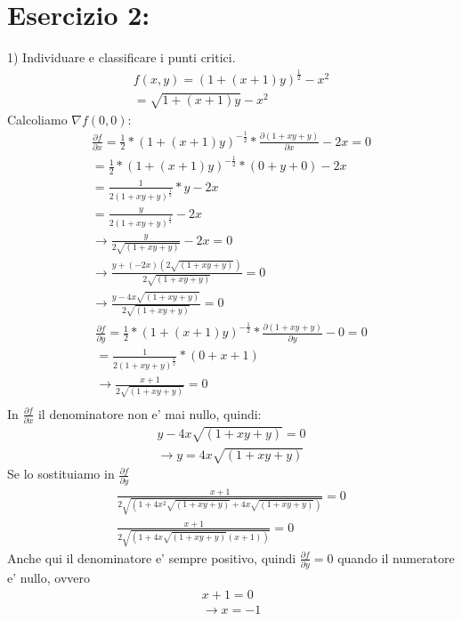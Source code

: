 \documentclass{article}
\begin{document}
\section*{Esercizio 2:}
1) Individuare e classificare i punti critici.\\
\begin{align*}
    f(x,y)=(1+(x+1)y)^\frac{1}{2}-x^2 \\
    = \sqrt{1+(x+1)y}-x^2
\end{align*}
Calcoliamo $\nabla f(0,0)$:
\begin{align*}
    \frac{\partial f}{\partial x}=\frac{1}{2}*(1+(x+1)y)^{-\frac{1}{2}}*\frac{\partial({1+xy+y})}{\partial x}-2x =0\\
    = \frac{1}{2} * (1+(x+1)y)^{-\frac{1}{2}} * (0 + y + 0) -2x \\
    = \frac{1}{2(1+xy+y)^\frac{1}{2}}*y -2x \\
    = \frac{y}{2(1+xy+y)^\frac{1}{2}} -2x \\ 
    \to \frac{y}{2\sqrt{(1+xy+y)}} -2x =0 \\
    \to \frac{y+(-2x)(2\sqrt{(1+xy+y)})}{2\sqrt{(1+xy+y)}}=0 \\
    \to  \frac{y-4x\sqrt{(1+xy+y)}}{2\sqrt{(1+xy+y)}}=0
\end{align*}
\begin{align*}
    \frac{\partial f}{\partial y}=\frac{1}{2}*(1+(x+1)y)^{-\frac{1}{2}}*\frac{\partial(1+xy+y)}{\partial y} - 0 =0\\
    = \frac{1}{2(1+xy+y)^\frac{1}{2}}*(0+x+1) \\
    \to \frac{x+1}{2\sqrt{(1+xy+y)}} = 0  \\
\end{align*}
In $\frac{\partial f}{\partial x}$ il denominatore non e' mai nullo, quindi: 
\begin{align*}
    {y-4x\sqrt{(1+xy+y)}}=0 \\
    \to y = 4x\sqrt{(1+xy+y)}
\end{align*}
Se lo sostituiamo in $\frac{\partial f}{\partial y}$
\begin{align*}
    \frac{x+1}{2\sqrt{(1+4x^2\sqrt{(1+xy+y)}+4x\sqrt{(1+xy+y)})}} = 0 \\
    \frac{x+1}{2\sqrt{(1+4x\sqrt{(1+xy+y)}(x+1))}} = 0
\end{align*}
Anche qui il denominatore e' sempre positivo, quindi $\frac{\partial f}{\partial y}=0$ quando il numeratore e' nullo, ovvero
\begin{align*}
    x+1=0 \\
    \to x=-1
\end{align*}
\end{document}
